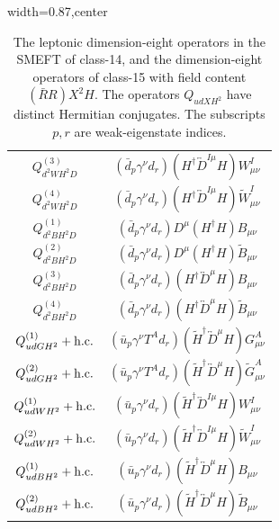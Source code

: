 \begin{table}[H]
\begin{center}
\begin{adjustbox}{width=0.87\textwidth,center}
\begin{minipage}[t]{6.4cm}
\begin{tabular}[t]{c|c}
%
$Q_{d^2WH^2D}^{(3)}$  &  $(\bar{d}_p \gamma^\nu d_r) (H^\dag \overleftrightarrow{D}^{I\mu} H) W_{\mu\nu}^I$ \\
%
$Q_{d^2WH^2D}^{(4)}$  &  $(\bar{d}_p \gamma^\nu d_r) (H^\dag \overleftrightarrow{D}^{I\mu} H) \widetilde W_{\mu\nu}^I$ \\
%
$Q_{d^2BH^2D}^{(1)}$  &  $(\bar{d}_p \gamma^\nu d_r) D^{\mu} (H^\dag H) B_{\mu\nu}$ \\
%
$Q_{d^2BH^2D}^{(2)}$  &  $(\bar{d}_p \gamma^\nu d_r) D^{\mu} (H^\dag H) \widetilde B_{\mu\nu}$ \\
%
$Q_{d^2BH^2D}^{(3)}$  &  $(\bar{d}_p \gamma^\nu d_r) (H^\dag \overleftrightarrow{D}^\mu H) B_{\mu\nu}$ \\
%
$Q_{d^2BH^2D}^{(4)}$  &  $(\bar{d}_p \gamma^\nu d_r) (H^\dag \overleftrightarrow{D}^\mu H) \widetilde B_{\mu\nu}$ \\
%
$Q_{udGH^2}^{(1)} + \mathrm{h.c.}$  &  $(\bar u_p \gamma^\nu T^A d_r) (\widetilde H^\dag \overleftrightarrow D^\mu H) G_{\mu\nu}^A $ \\
%
$Q_{udGH^2}^{(2)} + \mathrm{h.c.}$  &  $(\bar u_p \gamma^\nu T^A d_r) (\widetilde H^\dag \overleftrightarrow D^\mu H) \widetilde G_{\mu\nu}^A $ \\
%
$Q_{udWH^2}^{(1)} + \mathrm{h.c.}$  &  $(\bar u_p \gamma^\nu d_r) (\widetilde H^\dag \overleftrightarrow D^{I\mu} H) W_{\mu\nu}^I $ \\
%
$Q_{udWH^2}^{(2)} + \mathrm{h.c.}$  &  $(\bar u_p \gamma^\nu d_r) (\widetilde H^\dag \overleftrightarrow D^{I\mu} H) \widetilde W_{\mu\nu}^I $ \\
%
$Q_{udBH^2}^{(1)} + \mathrm{h.c.}$  &  $(\bar u_p \gamma^\nu d_r) (\widetilde H^\dag \overleftrightarrow{D}^\mu H) B_{\mu\nu}$ \\
%
$Q_{udBH^2}^{(2)} + \mathrm{h.c.}$  &  $(\bar u_p \gamma^\nu d_r) (\widetilde H^\dag \overleftrightarrow{D}^\mu H) \widetilde B_{\mu\nu}$
\end{tabular}
\end{minipage}
\end{adjustbox}
\end{center}
\caption{The leptonic dimension-eight operators in the SMEFT of class-14, and the dimension-eight operators of class-15 with field content $(\bar R R)X^2H$. The operators $Q_{udXH^2}$ have distinct Hermitian conjugates. The subscripts $p, r$ are weak-eigenstate indices.}
\label{tab:smeft8class_14le_15RR}
\end{table}

